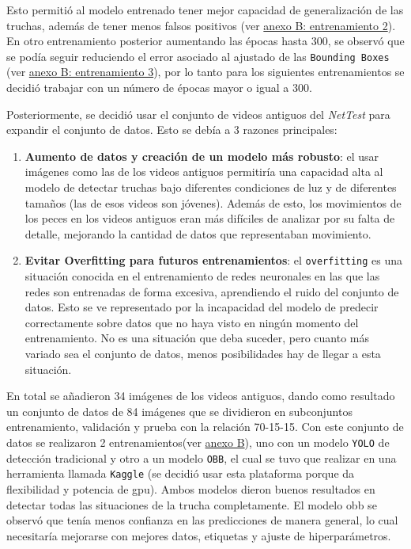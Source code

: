 Esto permitió al modelo entrenado tener mejor capacidad de generalización de las truchas, además de tener menos falsos positivos (ver \hyperref[train:2]{anexo B: entrenamiento 2}). En otro entrenamiento 
posterior aumentando las épocas hasta 300, se observó que se podía seguir reduciendo el error asociado al ajustado de las \texttt{Bounding Boxes} (ver \hyperref[train:3]{anexo B: entrenamiento 3}), por lo 
tanto para los siguientes entrenamientos se decidió trabajar con un número de épocas mayor o igual a 300.
\clearpage

Posteriormente, se decidió usar el conjunto de videos antiguos del \textit{NetTest} para expandir el conjunto de datos. Esto se debía a 3 razones principales:
\begin{enumerate}
    \item \textbf{Aumento de datos y creación de un modelo más robusto}: el usar imágenes como las de los videos antiguos permitiría una capacidad alta al modelo de detectar truchas bajo diferentes condiciones de luz y de diferentes tamaños (las de esos videos son 
    jóvenes). Además de esto, los movimientos de los peces en los videos antiguos eran más difíciles de analizar por su falta de detalle, mejorando la cantidad de datos que representaban movimiento.
    \item \textbf{Evitar Overfitting para futuros entrenamientos}: el \texttt{overfitting} es una situación conocida en el entrenamiento de redes neuronales en las que las redes son entrenadas de forma excesiva, aprendiendo el ruido
     del conjunto de datos. Esto se ve representado por la incapacidad del modelo de predecir correctamente sobre datos que no haya visto en ningún momento del entrenamiento. No es una situación que deba suceder, pero cuanto más 
    variado sea el conjunto de datos, menos posibilidades hay de llegar a esta situación.
\end{enumerate}

En total se añadieron 34 imágenes de los videos antiguos, dando como resultado un conjunto de datos de 84 imágenes que se dividieron en subconjuntos entrenamiento, validación y prueba con la relación 70-15-15.\newline
Con este conjunto de datos se realizaron 2 entrenamientos(ver \hyperref[train:4]{anexo B}), uno con un modelo \texttt{YOLO} de detección tradicional y otro a un modelo \texttt{OBB}, el cual se tuvo que realizar en una herramienta 
llamada \texttt{Kaggle} (se decidió usar esta plataforma porque da flexibilidad y potencia de \acrshort{gpu}).\newline
Ambos modelos dieron buenos resultados en detectar todas las situaciones de la trucha completamente. 
El modelo \acrshort{obb} se observó que tenía menos confianza en las predicciones de manera general, lo cual necesitaría mejorarse con mejores datos, etiquetas y ajuste de hiperparámetros.

